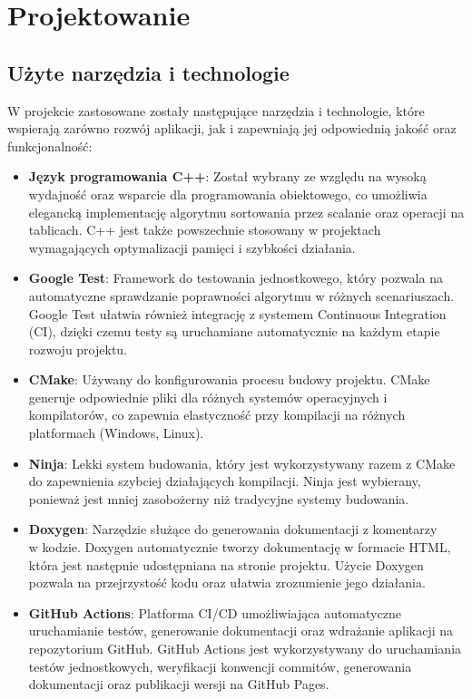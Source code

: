 \newpage
\section{Projektowanie}
\label{sec:projektowanie}

\subsection{Użyte narzędzia i technologie}

W projekcie zastosowane zostały następujące narzędzia i technologie, które wspierają zarówno rozwój aplikacji, jak i zapewniają jej odpowiednią jakość oraz funkcjonalność:

\begin{itemize}
  \item \textbf{Język programowania C++}: Został wybrany ze względu na wysoką wydajność oraz wsparcie dla programowania obiektowego, co umożliwia elegancką implementację algorytmu sortowania przez scalanie oraz operacji na tablicach. C++ jest także powszechnie stosowany w projektach wymagających optymalizacji pamięci i szybkości działania.
  \item \textbf{Google Test}: Framework do testowania jednostkowego, który pozwala na automatyczne sprawdzanie poprawności algorytmu w różnych scenariuszach. Google Test ułatwia również integrację z systemem Continuous Integration (CI), dzięki czemu testy są uruchamiane automatycznie na każdym etapie rozwoju projektu.
  \item \textbf{CMake}: Używany do konfigurowania procesu budowy projektu. CMake generuje odpowiednie pliki dla różnych systemów operacyjnych i kompilatorów, co zapewnia elastyczność przy kompilacji na różnych platformach (Windows, Linux).
  \item \textbf{Ninja}: Lekki system budowania, który jest wykorzystywany razem z CMake do zapewnienia szybciej działających kompilacji. Ninja jest wybierany, ponieważ jest mniej zasobożerny niż tradycyjne systemy budowania.
  \item \textbf{Doxygen}: Narzędzie służące do generowania dokumentacji z komentarzy \\ w kodzie. Doxygen automatycznie tworzy dokumentację w formacie HTML, która jest następnie udostępniana na stronie projektu. Użycie Doxygen pozwala na przejrzystość kodu oraz ułatwia zrozumienie jego działania.
  \item \textbf{GitHub Actions}: Platforma CI/CD umożliwiająca automatyczne uruchamianie testów, generowanie dokumentacji oraz wdrażanie aplikacji na repozytorium GitHub. GitHub Actions jest wykorzystywany do uruchamiania testów jednostkowych, weryfikacji konwencji commitów, generowania dokumentacji oraz publikacji wersji na GitHub Pages.
\end{itemize}

